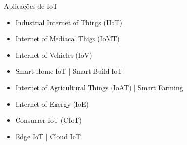 
\begin{frame}{Aplicações de IoT}

    \begin{itemize}
        \item Industrial Internet of Things (IIoT)
        \item Internet of Mediacal Thigs (IoMT)
        \item Internet of Vehicles (IoV)
        \item Smart Home IoT | Smart Build IoT
        \item Internet of Agricultural Things (IoAT) | Smart Farming
        \item Internet of Energy (IoE)
        \item Consumer IoT (CIoT)
        \item Edge IoT | Cloud IoT
    \end{itemize}

\end{frame}